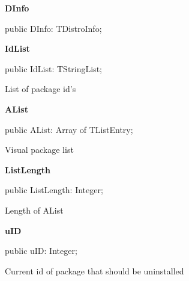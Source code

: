 \documentclass{report}
\newif\ifpdf
\begin{document}
\begin{list}{}
\begin{flushleft}
\ifpdf
\end{flushleft}
\fi


\par  \label{manager.TMnFrm-DInfo}
\item[\textbf{DInfo}\hfill]
\ifpdf
\begin{flushleft}
\fi
\begin{ttfamily}
public DInfo: TDistroInfo;\end{ttfamily}

\ifpdf
\end{flushleft}
\fi


\par  \label{manager.TMnFrm-IdList}
\item[\textbf{IdList}\hfill]
\ifpdf
\begin{flushleft}
\fi
\begin{ttfamily}
public IdList: TStringList;\end{ttfamily}

\ifpdf
\end{flushleft}
\fi


\par List of package id's\label{manager.TMnFrm-AList}
\item[\textbf{AList}\hfill]
\ifpdf
\begin{flushleft}
\fi
\begin{ttfamily}
public AList: Array of TListEntry;\end{ttfamily}

\ifpdf
\end{flushleft}
\fi


\par Visual package list\label{manager.TMnFrm-ListLength}
\item[\textbf{ListLength}\hfill]
\ifpdf
\begin{flushleft}
\fi
\begin{ttfamily}
public ListLength: Integer;\end{ttfamily}

\ifpdf
\end{flushleft}
\fi


\par Length of AList\label{manager.TMnFrm-uID}
\item[\textbf{uID}\hfill]
\ifpdf
\begin{flushleft}
\fi
\begin{ttfamily}
public uID: Integer;\end{ttfamily}

\ifpdf
\end{flushleft}
\fi


\par Current id of package that should be uninstalled\end{list}
\end{document}
